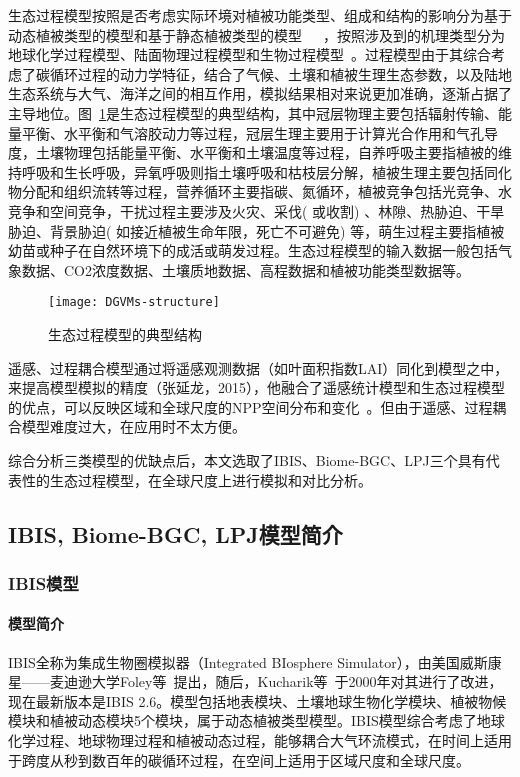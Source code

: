生态过程模型按照是否考虑实际环境对植被功能类型、组成和结构的影响分为基于动态植被类型的模型和基于静态植被类型的模型~\cite{王绍刚2008森林碳循环模型方法研究进展}~\cite{王萍2009基于}~\cite{毛留喜2006陆地生态系统碳循环模型研究概述}，按照涉及到的机理类型分为地球化学过程模型、陆面物理过程模型和生物过程模型~\cite{谢馨瑶2018大尺度森林碳循环过程模拟模型综述}。过程模型由于其综合考虑了碳循环过程的动力学特征，结合了气候、土壤和植被生理生态参数，以及陆地生态系统与大气、海洋之间的相互作用，模拟结果相对来说更加准确，逐渐占据了主导地位。图~\ref{fig:DGVMs-structure}是生态过程模型的典型结构，其中冠层物理主要包括辐射传输、能量平衡、水平衡和气溶胶动力等过程，冠层生理主要用于计算光合作用和气孔导度，土壤物理包括能量平衡、水平衡和土壤温度等过程，自养呼吸主要指植被的维持呼吸和生长呼吸，异氧呼吸则指土壤呼吸和枯枝层分解，植被生理主要包括同化物分配和组织流转等过程，营养循环主要指碳、氮循环，植被竞争包括光竞争、水竞争和空间竞争，干扰过程主要涉及火灾、采伐( 或收割) 、林隙、热胁迫、干旱胁迫、背景胁迫( 如接近植被生命年限，死亡不可避免) 等，萌生过程主要指植被幼苗或种子在自然环境下的成活或萌发过程。生态过程模型的输入数据一般包括气象数据、CO2浓度数据、土壤质地数据、高程数据和植被功能类型数据等。

\begin{figure}[!htbp]
    \centering
    \texttt{[image: DGVMs-structure]}
    \caption{生态过程模型的典型结构}
    \label{fig:DGVMs-structure}
\end{figure}

遥感、过程耦合模型通过将遥感观测数据（如叶面积指数LAI）同化到模型之中，来提高模型模拟的精度（张延龙，2015），他融合了遥感统计模型和生态过程模型的优点，可以反映区域和全球尺度的NPP空间分布和变化~\cite{朱文泉2005陆地植被净初级生产力计算模型研究进展}。但由于遥感、过程耦合模型难度过大，在应用时不太方便。

综合分析三类模型的优缺点后，本文选取了IBIS、Biome-BGC、LPJ三个具有代表性的生态过程模型，在全球尺度上进行模拟和对比分析。

\subsection{IBIS, Biome-BGC, LPJ模型简介}
\subsubsection{IBIS模型}
\paragraph{模型简介} IBIS全称为集成生物圈模拟器（Integrated BIosphere Simulator），由美国威斯康星——麦迪逊大学Foley等~\cite{foley1996integrated}提出，随后，Kucharik等~\cite{kucharik2000testing}于2000年对其进行了改进，现在最新版本是IBIS 2.6。模型包括地表模块、土壤地球生物化学模块、植被物候模块和植被动态模块5个模块，属于动态植被类型模型。IBIS模型综合考虑了地球化学过程、地球物理过程和植被动态过程，能够耦合大气环流模式，在时间上适用于跨度从秒到数百年的碳循环过程，在空间上适用于区域尺度和全球尺度。

